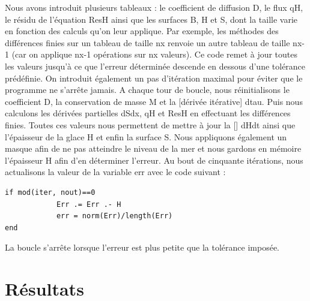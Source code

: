 \documentclass{article}
\begin{document}
\newline
Nous avons introduit plusieurs tableaux : le coefficient de diffusion D, le flux qH, le résidu de l'équation ResH ainsi que les surfaces B, H et S, dont la taille varie en fonction des calculs qu'on leur applique. Par exemple, les méthodes des différences finies sur un tableau de taille nx renvoie un autre tableau de taille nx-1 (car on applique nx-1 opérations sur nx valeurs).
\newline
Ce code remet à jour toutes les valeurs jusqu'à ce que l'erreur déterminée descende en dessous d'une tolérance prédéfinie. On introduit également un pas d'itération maximal pour éviter que le programme ne s'arrête jamais.
\newline
A chaque tour de boucle, nous réinitialisons le coefficient D, la conservation de masse M et la [dérivée itérative] dtau. Puis nous calculons les dérivées partielles dSdx, qH et ResH en effectuant les différences finies. Toutes ces valeurs nous permettent de mettre à jour la [] dHdt ainsi que l'épaisseur de la glace H et enfin la surface S. Nous appliquons également un masque afin de ne pas atteindre le niveau de la mer et nous gardons en mémoire l'épaisseur H afin d'en déterminer l'erreur.
\newline
Au bout de cinquante itérations, nous actualisons la valeur de la variable err avec le code suivant :
\begin{verbatim}
if mod(iter, nout)==0 
            Err .= Err .- H
            err = norm(Err)/length(Err) 
end
\end{verbatim}
La boucle s'arrête lorsque l'erreur est plus petite que la tolérance imposée.

\section{Résultats}
\end{document}
